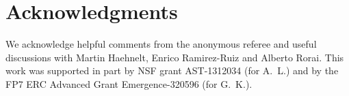 \documentclass[a4paper,fleqn,usenatbib]{mnras}
\begin{document}
\section*{Acknowledgments}

We acknowledge helpful comments from the anonymous referee and useful
discussions with Martin Haehnelt, Enrico Ramirez-Ruiz and Alberto
Rorai.  This work was supported in part by NSF grant AST-1312034 (for
A.~L.) and by the FP7 ERC Advanced Grant Emergence-320596 (for G.~K.).


 

\bsp
\label{lastpage}
\end{document}
